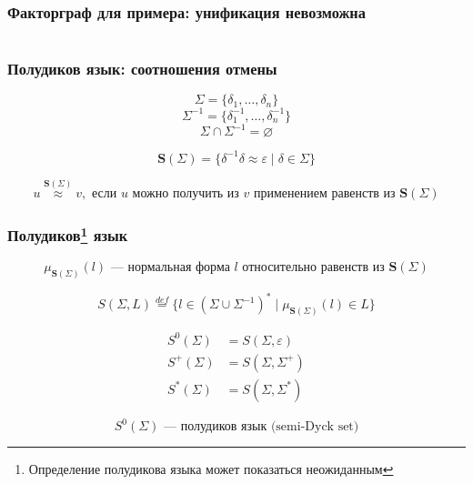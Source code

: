 \documentclass[aspectratio=169]{beamer}
\begin{document}
\begin{frame}[fragile]
  \frametitle{Факторграф для примера: унификация невозможна}

  \begin{columns}
    \begin{column}{0.3\textwidth}
      \begin{center}
        
      \end{center}
    \end{column}
    \begin{column}{0.7\textwidth}
      \begin{center}
        
      \end{center}
    \end{column}
    \end{columns}
\end{frame}

\begin{frame}[fragile]
  \frametitle{Полудиков язык: соотношения отмены}
\[
  \Sigma = \{\delta_1, \dots, \delta_n \}
\]
\[
  \Sigma^{-1} = \{\delta_1^{-1}, \dots, \delta_n^{-1} \}
\]
\[
  \Sigma \cap \Sigma^{-1} = \varnothing
\]

\[
  \bm{S}(\Sigma) = \{\delta^{-1} \delta \approx \varepsilon \mid \delta \in \Sigma \}
\]

\[
  u \stackrel{\bm{S}(\Sigma)}{\approx} v, \text{ если } u \text{ можно получить из } v \text{ применением равенств из } \bm{S}(\Sigma)
\]
\end{frame}

\begin{frame}[fragile]
  \frametitle{Полудиков\footnote{Определение полудикова языка может показаться неожиданным} язык}
\[
  \mu_{\bm{S}(\Sigma)}(l) \text{ --- нормальная форма } l \text{ относительно равенств из } \bm{S}(\Sigma)
\]

\[
  S(\Sigma, L) \stackrel{def}{=} \{ l \in (\Sigma \cup \Sigma^{-1})^* \mid \mu_{\bm{S}(\Sigma)}(l) \in L\}
\]

\begin{align*}
  S^0(\Sigma) &= S(\Sigma, {\varepsilon}) \\
  S^+(\Sigma) &= S(\Sigma, \Sigma^+) \\
  S^*(\Sigma) &= S(\Sigma, \Sigma^*)
\end{align*}

\bigskip

  \[
    S^0(\Sigma) \text{ --- полудиков язык (semi-Dyck set)}
  \]

  \bigskip

\end{frame}
\end{document}

